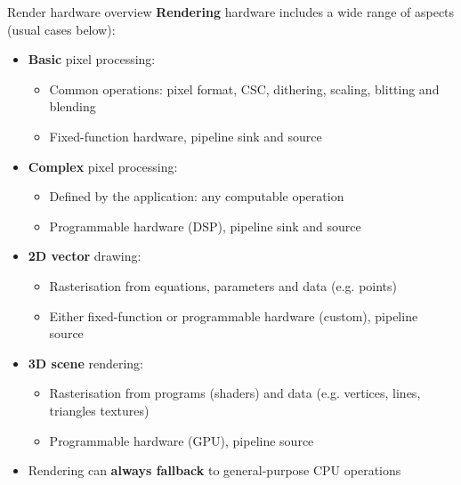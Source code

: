 \begin{frame}{Render hardware overview}
  \textbf{Rendering} hardware includes a wide range of aspects (usual cases below):
  \begin{itemize}
  \item \textbf{Basic} pixel processing:
  \begin{itemize}
    \item Common operations: pixel format, CSC, dithering, scaling, blitting and blending
    \item Fixed-function hardware, pipeline sink and source
  \end{itemize}
  \item \textbf{Complex} pixel processing:
  \begin{itemize}
    \item Defined by the application: any computable operation
    \item Programmable hardware (DSP), pipeline sink and source
  \end{itemize}
  \item \textbf{2D vector} drawing:
  \begin{itemize}
    \item Rasterisation from equations, parameters and data (e.g. points)
    \item Either fixed-function or programmable hardware (custom), pipeline source
  \end{itemize}
  \item \textbf{3D scene} rendering:
  \begin{itemize}
    \item Rasterisation from programs (shaders) and data (e.g. vertices, lines, triangles textures)
    \item Programmable hardware (GPU), pipeline source
  \end{itemize}
  \item Rendering can \textbf{always fallback} to general-purpose CPU operations
  \end{itemize}
\end{frame}

